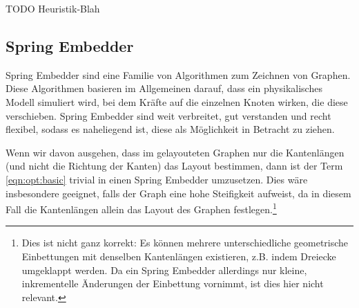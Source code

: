 TODO Heuristik-Blah

\subsection{Spring Embedder}

Spring Embedder sind eine Familie von Algorithmen zum Zeichnen von Graphen. Diese Algorithmen basieren im Allgemeinen darauf, dass ein physikalisches Modell simuliert wird, bei dem Kräfte auf die einzelnen Knoten wirken, die diese verschieben. Spring Embedder sind weit verbreitet, gut verstanden und recht flexibel\cite{kobourov2012spring}, sodass es naheliegend ist, diese als Möglichkeit in Betracht zu ziehen.

Wenn wir davon ausgehen, dass im gelayouteten Graphen nur die Kantenlängen (und nicht die Richtung der Kanten) das Layout bestimmen, dann ist der Term \ref{eqn:opt:basic} trivial in einen Spring Embedder umzusetzen. Dies wäre insbesondere geeignet, falls der Graph eine hohe Steifigkeit aufweist, da in diesem Fall die Kantenlängen allein das Layout des Graphen festlegen.\footnote{Dies ist nicht ganz korrekt: Es können mehrere unterschiedliche geometrische Einbettungen mit denselben Kantenlängen existieren, z.B. indem Dreiecke umgeklappt werden. Da ein Spring Embedder allerdings nur kleine, inkrementelle Änderungen der Einbettung vornimmt, ist dies hier nicht relevant.}

